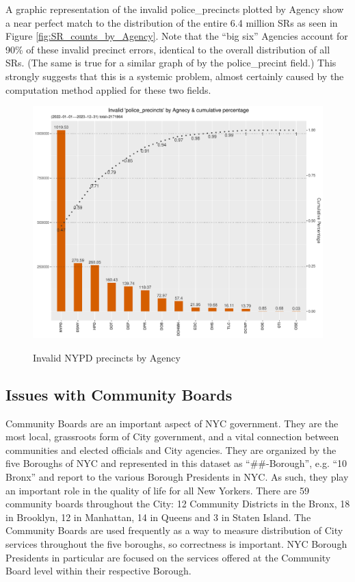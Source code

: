 \documentclass[12pt, titlepage]{article}
\begin{document}
{	A graphic representation of the invalid police\_precincts plotted by Agency show a near perfect match to the
	distribution of the entire 6.4 million SRs as seen in Figure \ref{fig:SR_counts_by_Agency}. Note that the ``big six'' Agencies account for 90\% of these invalid precinct errors, identical
	to the overall distribution of all SRs. (The same is true for a similar graph of by the police\_precint field.) This strongly suggests that this is a systemic problem, almost certainly caused by the computation method applied for these two fields.
	 
	\begin{figure}[tbp]
	  \centering
	  \caption{Invalid NYPD precincts by Agency}
	  \includegraphics[width=\textwidth]{invalid_police_precincts.pdf}	  
	  \label{fig:invalid_police_precincts_zip}
	\end{figure}

	\subsection{Issues with Community Boards}
	Community Boards are an important aspect of NYC government. They are the most local, grassroots form of City government, 
	and a vital connection between communities and elected officials and City agencies. They are organized by the five Boroughs of NYC and represented
	in this dataset as ``\#\#-Borough'', e.g. ``10 Bronx'' and report to the various Borough Presidents in NYC. As such, they play an important role in the quality of life for all New Yorkers.
	There are 59 community boards throughout the City: 12 Community Districts in the Bronx, 18 in Brooklyn, 12 in Manhattan, 14 in Queens and 3 in Staten Island.
	The Community Boards are used frequently as a way to measure distribution of City services throughout the five boroughs, so correctness is important. 
	NYC Borough Presidents in particular are focused on the services offered at the Community Board level within their respective Borough.
	
}
\end{document}
